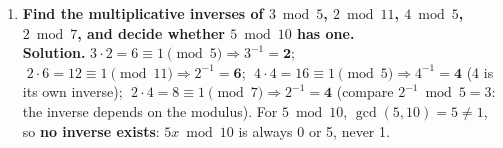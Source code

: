 \begin{enumerate}[leftmargin=1.6em,itemsep=4pt]
  \item \textbf{Find the multiplicative inverses of $3 \bmod 5$, $2 \bmod 11$, $4 \bmod 5$, $2 \bmod 7$, and decide whether $5 \bmod 10$ has one.}\\
  \textbf{Solution.} $3 \cdot 2 = 6 \equiv 1 \pmod 5 \Rightarrow 3^{-1} = \mathbf 2$; $\;2 \cdot 6 = 12 \equiv 1 \pmod{11} \Rightarrow 2^{-1} = \mathbf 6$; $\;4 \cdot 4 = 16 \equiv 1 \pmod 5 \Rightarrow 4^{-1} = \mathbf 4$ (4 is its own inverse); $\;2 \cdot 4 = 8 \equiv 1 \pmod 7 \Rightarrow 2^{-1} = \mathbf 4$ (compare $2^{-1} \bmod 5 = 3$: the inverse depends on the modulus). For $5 \bmod 10$, $\gcd(5, 10) = 5 \ne 1$, so \textbf{no inverse exists}: $5x \bmod 10$ is always 0 or 5, never 1.
\end{enumerate}
